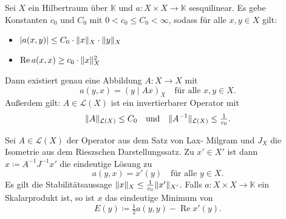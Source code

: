 \documentclass{cheat-sheet}
\newcommand{\K}{\mathbb{K}}
\newcommand{\LSO}{\mathcal{L}} %
\newcommand{\scp}[2]{\left( #1 \!\mid\! #2 \right)} %
\renewcommand{\Re}{\operatorname{Re}} %
\begin{document}
\begin{satz}
  Sei $X$ ein Hilbertraum über $\K$ und $a : X \times X \to \K$ sesquilinear. Es gebe Konstanten $c_0$ und $C_0$ mit $0 < c_0 \leq C_0 < \infty$, sodass für alle $x, y \in X$ gilt:
  \begin{itemize}
    \item $\lvert a(x, y)\rvert \leq C_0 \cdot \lVert x\rVert_X \cdot \lVert y\rVert_X$ 
    \item $\Re a(x, x) \geq c_0 \cdot \norm{x}_X^2$ 
  \end{itemize}
  Dann existiert genau eine Abbildung $A : X \to X$ mit
  \[ a(y, x) = \scp{y}{Ax}_X \quad \text{für alle $x, y \in X$.} \]
  Außerdem gilt: $A \in \LSO(X)$ ist ein invertierbarer Operator mit
  \[
    \norm{A}_{\LSO(X)} \leq C_0
    \quad \text{und} \quad
    \norm{A^{-1}}_{\LSO(X)} \leq \tfrac{1}{c_0}.
  \]
\end{satz}

\begin{kor}
  Sei $A \in \LSO(X)$ der Operator aus dem Satz von Lax- Milgram und $J_X$ die Isometrie aus dem Rieszschen Darstellungssatz. Zu $x' \in X'$ ist dann $x \coloneqq A^{-1} J^{-1} x'$ die eindeutige Lösung zu
  \[ a(y, x) = x'(y) \quad \text{für alle $y \in X$.} \]
  Es gilt die Stabilitätsaussage $\lVert x\rVert_X \leq \tfrac{1}{c_0} \lVert x'\rVert_{X'}$.
  Falls $a : X {\times} X \to \K$ ein Skalarprodukt ist, so ist $x$ das eindeutige Minimum von
  \[ E(y) \coloneqq \tfrac{1}{2} a(y, y) - \Re x'(y). \]
\end{kor}

\end{document}
